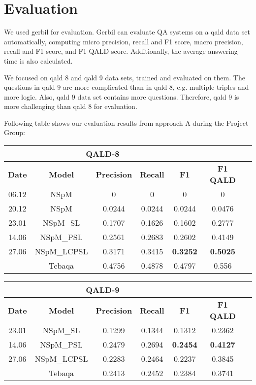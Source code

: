 
\section{Evaluation}

We used gerbil for evaluation.
Gerbil can evaluate QA systems on a qald data set automatically,
computing micro precision, recall and F1 score, 
macro precision, recall and F1 score,
and F1 QALD score. 
Additionally, the average answering time is also calculated. 

We focused on qald 8 and qald 9 data sets, trained and evaluated on them. 
The questions in qald 9 are more complicated than in qald 8, 
e.g. multiple triples and more logic. 
Also, qald 9 data set contains more questions.
Therefore, qald 9 is more challenging than qald 8 for evaluation. 

Following table shows our evaluation results from approach A during the Project Group:

\begin{tabular}{ccccccc} \hline
    \multicolumn{5}{c}{QALD-8} \\ \hline
    \textbf{Date} & \textbf{Model}  & \textbf{Precision} & \textbf{Recall} & \textbf{F1} & \textbf{F1 QALD} \\ \hline
    06.12       & NSpM          & 0         & 0         & 0         & 0         \\
    20.12       & NSpM          & 0.0244    & 0.0244    & 0.0244    & 0.0476    \\
    23.01       & NSpM\_SL       & 0.1707    & 0.1626    & 0.1602    & 0.2777    \\
    14.06       & NSpM\_PSL      & 0.2561    & 0.2683    & 0.2602    & 0.4149    \\
    27.06       & NSpM\_LCPSL    & 0.3171    & 0.3415    & \textbf{0.3252}    & \textbf{0.5025}    \\
    \hline
                & Tebaqa        & 0.4756     & 0.4878    & 0.4797   & 0.556   \\
    \hline
\end{tabular}

\break

\begin{tabular}{ccccccc} \hline
    \multicolumn{5}{c}{QALD-9} \\ \hline
    \textbf{Date} & \textbf{Model}  & \textbf{Precision} & \textbf{Recall} & \textbf{F1} & \textbf{F1 QALD} \\ \hline
    23.01       & NSpM\_SL       & 0.1299    & 0.1344    & 0.1312    & 0.2362    \\
    14.06       & NSpM\_PSL      & 0.2479    & 0.2694	 & \textbf{0.2454}    & \textbf{0.4127}    \\
    27.06       & NSpM\_LCPSL    & 0.2283    & 0.2464    & 0.2237    & 0.3845    \\
    \hline
                & Tebaqa        & 0.2413    & 0.2452    & 0.2384    & 0.3741  \\
    \hline
\end{tabular}

